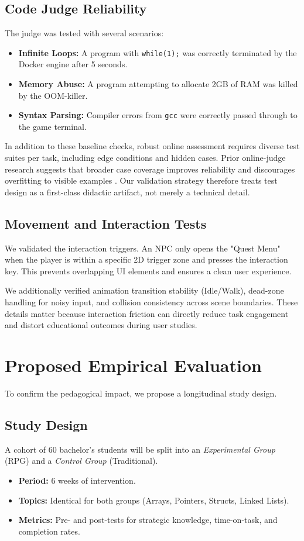 \documentclass[a4paper, UKenglish, cleveref, autoref, thm-restate]{oasics-v2021}
\begin{document}
\subsection{Code Judge Reliability}
The judge was tested with several scenarios:
\begin{itemize}
    \item \textbf{Infinite Loops:} A program with \texttt{while(1);} was correctly terminated by the Docker engine after 5 seconds.
    \item \textbf{Memory Abuse:} A program attempting to allocate 2GB of RAM was killed by the OOM-killer.
    \item \textbf{Syntax Parsing:} Compiler errors from \texttt{gcc} were correctly passed through to the game terminal.
\end{itemize}

In addition to these baseline checks, robust online assessment requires diverse test suites per task, including edge conditions and hidden cases. Prior online-judge research suggests that broader case coverage improves reliability and discourages overfitting to visible examples \cite{li2020faultlocalization,latih2017pc2}. Our validation strategy therefore treats test design as a first-class didactic artifact, not merely a technical detail.

\subsection{Movement and Interaction Tests}
We validated the interaction triggers. An NPC only opens the "Quest Menu" when the player is within a specific 2D trigger zone and presses the interaction key. This prevents overlapping UI elements and ensures a clean user experience.

We additionally verified animation transition stability (Idle/Walk), dead-zone handling for noisy input, and collision consistency across scene boundaries. These details matter because interaction friction can directly reduce task engagement and distort educational outcomes during user studies.

\section{Proposed Empirical Evaluation}
To confirm the pedagogical impact, we propose a longitudinal study design.
\subsection{Study Design}
A cohort of 60 bachelor's students will be split into an \textit{Experimental Group} (RPG) and a \textit{Control Group} (Traditional).
\begin{itemize}
    \item \textbf{Period:} 6 weeks of intervention.
    \item \textbf{Topics:} Identical for both groups (Arrays, Pointers, Structs, Linked Lists).
    \item \textbf{Metrics:} Pre- and post-tests for strategic knowledge, time-on-task, and completion rates.
\end{itemize}
\end{document}
